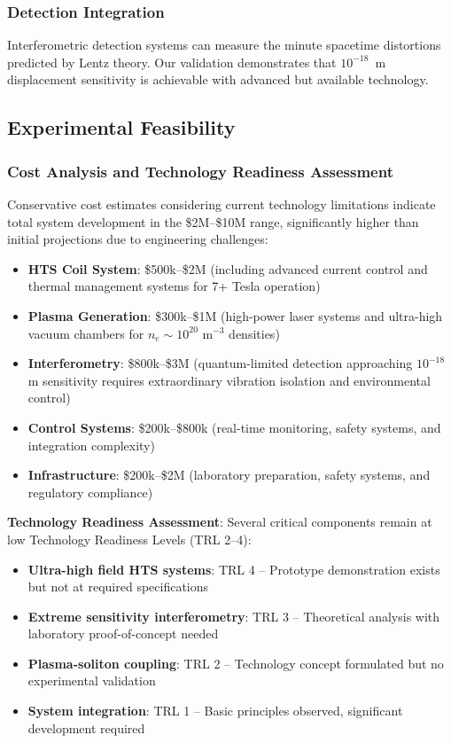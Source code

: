 \documentclass[10pt,twocolumn]{article}
\begin{document}
\subsubsection{Detection Integration}
Interferometric detection systems can measure the minute spacetime distortions predicted by Lentz theory. Our validation demonstrates that $10^{-18}$~m displacement sensitivity is achievable with advanced but available technology.

\subsection{Experimental Feasibility}

\subsubsection{Cost Analysis and Technology Readiness Assessment}
Conservative cost estimates considering current technology limitations indicate total system development in the \$2M--\$10M range, significantly higher than initial projections due to engineering challenges:
\begin{itemize}
\item \textbf{HTS Coil System}: \$500k--\$2M (including advanced current control and thermal management systems for 7+ Tesla operation)
\item \textbf{Plasma Generation}: \$300k--\$1M (high-power laser systems and ultra-high vacuum chambers for $n_e \sim 10^{20}$ m$^{-3}$ densities)
\item \textbf{Interferometry}: \$800k--\$3M (quantum-limited detection approaching $10^{-18}$ m sensitivity requires extraordinary vibration isolation and environmental control)
\item \textbf{Control Systems}: \$200k--\$800k (real-time monitoring, safety systems, and integration complexity)
\item \textbf{Infrastructure}: \$200k--\$2M (laboratory preparation, safety systems, and regulatory compliance)
\end{itemize}

\textbf{Technology Readiness Assessment}: Several critical components remain at low Technology Readiness Levels (TRL 2--4):
\begin{itemize}
\item \textbf{Ultra-high field HTS systems}: TRL 4 -- Prototype demonstration exists but not at required specifications
\item \textbf{Extreme sensitivity interferometry}: TRL 3 -- Theoretical analysis with laboratory proof-of-concept needed
\item \textbf{Plasma-soliton coupling}: TRL 2 -- Technology concept formulated but no experimental validation
\item \textbf{System integration}: TRL 1 -- Basic principles observed, significant development required
\end{itemize}
\end{document}
